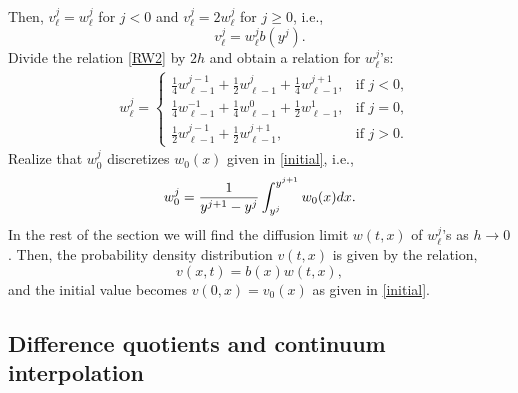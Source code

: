 \documentclass[11pt]{amsart}
\begin{document}
Then, $v^{j}_\ell=w^{j}_\ell$ for $j<0$ and $v^{j}_\ell=2w^{j}_\ell$ for
$j\ge0$, i.e.,
$$
v^j_\ell=w_\ell^j b(y^j).
$$
Divide the relation \eqref{RW2} by $2h$ and obtain a relation for $w^{j}_\ell$'s:
\begin{equation} \label{RW3}%
\begin{aligned}
    &w^{j}_\ell = \left\{\begin{array}{ll}
        \frac{1}{4}w^{j-1} _{\ell-1} + \frac{1}{2}w ^{j} _{\ell-1} +
        \frac{1}{4} w^{j+1}_{\ell-1}, & \text{if $j<0$},\\
        \frac{1}{4}w^{-1} _{\ell-1} + \frac{1}{4}w^{0} _{\ell-1} +
        \frac{1}{2}w ^{1} _{\ell-1}, & \text{if $j=0$},\\
        \frac{1}{2}w^{j-1} _{\ell-1} + \frac{1}{2}w ^{j+1} _{\ell-1}, &
        \text{if } j>0.
        \end{array}\right.
\end{aligned}
\end{equation}
Realize that $w^{j}_0$ discretizes $w_0(x)$ given in \eqref{initial}, i.e.,
\begin{equation} \label{vol_aver+pmf}
w_{0}^{j} ={1\over y^{j+1}-y^{j}}\int_{y^j}^{y^{j+1}} w_0(x)dx.
\end{equation}
In the rest of the section we will find the diffusion limit $w(t,x)$ of $w_\ell^j$'s as $h\to0$. Then, the probability density distribution $v(t,x)$ is given by the relation,
$$
v(x,t)=b(x)w(t,x),
$$
and the initial value becomes $v(0,x)=v_0(x)$ as given in \eqref{initial}.

\subsection{Difference quotients and continuum interpolation}
\end{document}
